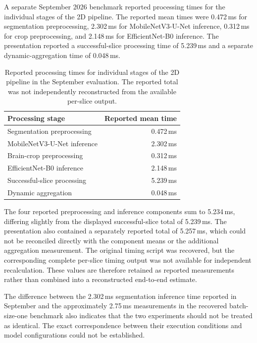 A separate September 2026 benchmark reported processing times for the individual stages of the 2D pipeline. The reported mean times were 0.472\,ms for segmentation preprocessing, 2.302\,ms for MobileNetV3-U-Net inference, 0.312\,ms for crop preprocessing, and 2.148\,ms for EfficientNet-B0 inference. The presentation reported a successful-slice processing time of 5.239\,ms and a separate dynamic-aggregation time of 0.048\,ms.

\begin{table}[htbp]
\centering
\caption{Reported processing times for individual stages of the 2D pipeline in the September evaluation. The reported total was not independently reconstructed from the available per-slice output.}
\label{tab:results_2d_stage_latency}
\begin{tabular}{lr}
\hline
Processing stage & Reported mean time \\
\hline
Segmentation preprocessing & 0.472\,ms \\
MobileNetV3-U-Net inference & 2.302\,ms \\
Brain-crop preprocessing & 0.312\,ms \\
EfficientNet-B0 inference & 2.148\,ms \\
Successful-slice processing & 5.239\,ms \\
Dynamic aggregation & 0.048\,ms \\
\hline
\end{tabular}
\end{table}

The four reported preprocessing and inference components sum to 5.234\,ms, differing slightly from the displayed successful-slice total of 5.239\,ms. The presentation also contained a separately reported total of 5.257\,ms, which could not be reconciled directly with the component means or the additional aggregation measurement. The original timing script was recovered, but the corresponding complete per-slice timing output was not available for independent recalculation. These values are therefore retained as reported measurements rather than combined into a reconstructed end-to-end estimate.

The difference between the 2.302\,ms segmentation inference time reported in September and the approximately 2.75\,ms measurements in the recovered batch-size-one benchmark also indicates that the two experiments should not be treated as identical. The exact correspondence between their execution conditions and model configurations could not be established.

